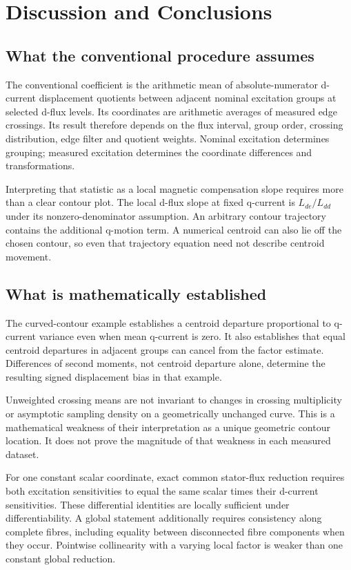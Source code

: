 \chapter{Discussion and Conclusions}\label{ch:conclusions}

\section{What the conventional procedure assumes}
The conventional coefficient is the arithmetic mean of absolute-numerator d-current displacement quotients between adjacent nominal excitation groups at selected d-flux levels. Its coordinates are arithmetic averages of measured edge crossings. Its result therefore depends on the flux interval, group order, crossing distribution, edge filter and quotient weights. Nominal excitation determines grouping; measured excitation determines the coordinate differences and transformations.

Interpreting that statistic as a local magnetic compensation slope requires more than a clear contour plot. The local d-flux slope at fixed q-current is $L_{de}/L_{dd}$ under its nonzero-denominator assumption. An arbitrary contour trajectory contains the additional q-motion term. A numerical centroid can also lie off the chosen contour, so even that trajectory equation need not describe centroid movement.

\section{What is mathematically established}
The curved-contour example establishes a centroid departure proportional to q-current variance even when mean q-current is zero. It also establishes that equal centroid departures in adjacent groups can cancel from the factor estimate. Differences of second moments, not centroid departure alone, determine the resulting signed displacement bias in that example.

Unweighted crossing means are not invariant to changes in crossing multiplicity or asymptotic sampling density on a geometrically unchanged curve. This is a mathematical weakness of their interpretation as a unique geometric contour location. It does not prove the magnitude of that weakness in each measured dataset.

For one constant scalar coordinate, exact common stator-flux reduction requires both excitation sensitivities to equal the same scalar times their d-current sensitivities. These differential identities are locally sufficient under differentiability. A global statement additionally requires consistency along complete fibres, including equality between disconnected fibre components when they occur. Pointwise collinearity with a varying local factor is weaker than one constant global reduction.

